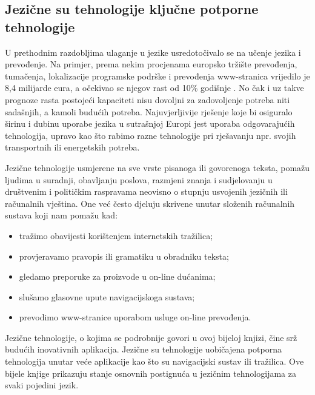 \begin{multicols}{2}

\subsection{Jezične su tehnologije ključne potporne tehnologije}

U prethodnim razdobljima ulaganje u jezike usredotočivalo se na učenje jezika i prevođenje. Na primjer, prema nekim procjenama europsko tržište prevođenja, tumačenja, lokalizacije programske podrške i prevođenja www-stranica vrijedilo je 8,4 milijarde eura, a očekivao se njegov rast od 10\% godišnje \cite{str5}. No čak i uz takve prognoze rasta postojeći kapaciteti nisu dovoljni za zadovoljenje potreba niti sadašnjih, a kamoli budućih potreba. Najuvjerljivije rješenje koje bi osiguralo širinu i dubinu uporabe jezika u sutrašnjoj Europi jest uporaba odgovarajućih tehnologija, upravo kao što rabimo razne tehnologije pri rješavanju npr. svojih transportnih ili energetskih potreba.

Jezične tehnologije usmjerene na sve vrste pisanoga ili govorenoga teksta, pomažu ljudima u suradnji, obavljanju poslova, razmjeni znanja i sudjelovanju u društvenim i političkim raspravama neovisno o stupnju usvojenih jezičnih ili računalnih vještina. One već često djeluju skrivene unutar složenih računalnih sustava koji nam pomažu kad:

\begin{itemize}
\item tražimo obavijesti korištenjem internetskih tražilica;
\item provjeravamo pravopis ili gramatiku u obradniku teksta;
\item gledamo preporuke za proizvode u on-line dućanima;
\item slušamo glasovne upute navigacijskoga sustava;
\item prevodimo www-stranice uporabom usluge on-line prevođenja.
\end{itemize}

Jezične tehnologije, o kojima se podrobnije govori u ovoj bijeloj knjizi, čine srž budućih inovativnih aplikacija. Jezične su tehnologije uobičajena potporna tehnologija unutar veće aplikacije kao što su navigacijski sustav ili tražilica. Ove bijele knjige prikazuju stanje osnovnih postignuća u jezičnim tehnologijama za svaki pojedini jezik.


\end{multicols}
